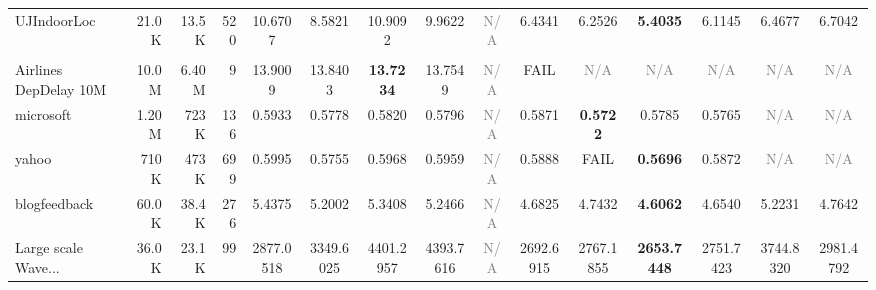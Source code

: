 \begin{table}[t]
{\begin{tabular}{lrrrccccccccccc}
UJIndoorLoc & 21.0K & 13.5K & 520 & \cellcolor[HTML]{F5CFCC}10.6707 & \cellcolor[HTML]{FDECCC}8.5821 & \cellcolor[HTML]{F4CCCC}10.9092 & \cellcolor[HTML]{F8D9CC}9.9622 & \textcolor{gray}{N/A} & \cellcolor[HTML]{E7EDD0}6.4341 & \cellcolor[HTML]{E5ECD1}6.2526 & \cellcolor[HTML]{D9EAD3}\textbf{5.4035} & \cellcolor[HTML]{E3ECD1}6.1145 & \cellcolor[HTML]{E8EDD0}6.4677 & \cellcolor[HTML]{EBEED0}6.7042 \\
\addlinespace[2pt]
\rowcolor{gray!15}
\multicolumn{15}{l}{\textbf{MAE}} \\
Airlines DepDelay 10M & 10.0M & 6.40M & 9 & \cellcolor[HTML]{F4CCCC}13.9009 & \cellcolor[HTML]{FCE6CC}13.8403 & \cellcolor[HTML]{D9EAD3}\textbf{13.7234} & \cellcolor[HTML]{E6EDD1}13.7549 & \textcolor{gray}{N/A} & \textcolor{red!70!black}{FAIL} & \textcolor{gray}{N/A} & \textcolor{gray}{N/A} & \textcolor{gray}{N/A} & \textcolor{gray}{N/A} & \textcolor{gray}{N/A} \\
microsoft & 1.20M & 723K & 136 & \cellcolor[HTML]{F4CCCC}0.5933 & \cellcolor[HTML]{EDEECF}0.5778 & \cellcolor[HTML]{FCF1CC}0.5820 & \cellcolor[HTML]{F4F0CE}0.5796 & \textcolor{gray}{N/A} & \cellcolor[HTML]{FAE2CC}0.5871 & \cellcolor[HTML]{D9EAD3}\textbf{0.5722} & \cellcolor[HTML]{F0EFCF}0.5785 & \cellcolor[HTML]{E8EDD0}0.5765 & \textcolor{gray}{N/A} & \textcolor{gray}{N/A} \\
yahoo & 710K & 473K & 699 & \cellcolor[HTML]{F4CCCC}0.5995 & \cellcolor[HTML]{E8EDD0}0.5755 & \cellcolor[HTML]{F6D3CC}0.5968 & \cellcolor[HTML]{F7D5CC}0.5959 & \textcolor{gray}{N/A} & \cellcolor[HTML]{FCE7CC}0.5888 & \textcolor{red!70!black}{FAIL} & \cellcolor[HTML]{D9EAD3}\textbf{0.5696} & \cellcolor[HTML]{FDEBCC}0.5872 & \textcolor{gray}{N/A} & \textcolor{gray}{N/A} \\
blogfeedback & 60.0K & 38.4K & 276 & \cellcolor[HTML]{F4CCCC}5.4375 & \cellcolor[HTML]{FAE2CC}5.2002 & \cellcolor[HTML]{F7D5CC}5.3408 & \cellcolor[HTML]{F9DDCC}5.2466 & \textcolor{gray}{N/A} & \cellcolor[HTML]{E0EBD2}4.6825 & \cellcolor[HTML]{E6EDD1}4.7432 & \cellcolor[HTML]{D9EAD3}\textbf{4.6062} & \cellcolor[HTML]{DDEBD2}4.6540 & \cellcolor[HTML]{FAE0CC}5.2231 & \cellcolor[HTML]{E7EDD0}4.7642 \\
Large scale Wave... & 36.0K & 23.1K & 99 & \cellcolor[HTML]{E3ECD1}2877.0518 & \cellcolor[HTML]{F7F0CD}3349.6025 & \cellcolor[HTML]{F4CCCC}4401.2957 & \cellcolor[HTML]{F4CCCC}4393.7616 & \textcolor{gray}{N/A} & \cellcolor[HTML]{DBEAD3}2692.6915 & \cellcolor[HTML]{DEEBD2}2767.1855 & \cellcolor[HTML]{D9EAD3}\textbf{2653.7448} & \cellcolor[HTML]{DDEBD2}2751.7423 & \cellcolor[HTML]{FCE9CC}3744.8320 & \cellcolor[HTML]{E7EDD0}2981.4792 \\

\end{tabular}}
\end{table}
